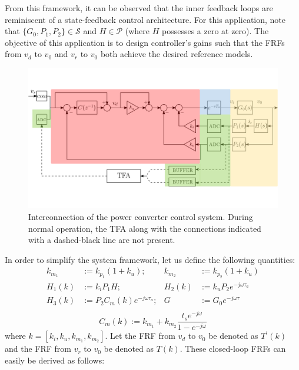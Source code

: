 \documentclass[a4paper, 10pt, conference]{ieeeconf}
\begin{document}
From this framework, it can be observed that the inner feedback loops are reminiscent of a state-feedback control architecture. For this application, note that $\{G_0,P_1,P_2 \} \in \mathscr{S}$ and $H \in \mathscr{P}$ (where $H$ possesses a zero at zero). The objective of this application is to design controller's gains such that the FRFs from $v_d$ to $v_0$ and $v_r$ to $v_0$ both achieve the desired reference models.
\begin{figure}
\centering
\includegraphics[width=1.6\columnwidth]{../pics/voltage_loop_color_coded}
\caption{Interconnection of the power converter control system. During normal operation, the TFA along with the connections indicated with a dashed-black line are not present.}
\label{fig:damping_loop}
\end{figure}

In order to simplify the system framework, let us define the following quantities:
\begin{equation} \label{eq:new_var}
\begin{aligned}
k_{m_1} &:= k_{p_1}(1+k_u) ;  &k_{m_2} &:= k_{p_2}(1+k_u)  \\
H_1(k) &:= k_iP_1H;  &H_2(k) &:= k_uP_2e^{-j\omega \tau_{a}} \\
H_3(k) &:=  P_2C_m(k)e^{-j\omega\tau_{a}}; &G &:= G_0e^{-j\omega\tau} \\ 
\end{aligned}
\end{equation}
\begin{equation*}
C_m(k) := k_{m_1}+k_{m_2}\frac{t_se^{-j\omega}}{1-e^{-j\omega}}
\end{equation*}
where $k = [k_i,k_u,k_{m_1},k_{m_2}]$. Let the FRF from $v_d$ to $v_0$ be denoted as $T^{\prime}(k)$ and the FRF from $v_r$ to $v_0$ be denoted as $T(k)$. These closed-loop FRFs can easily be derived as follows:
\end{document}

